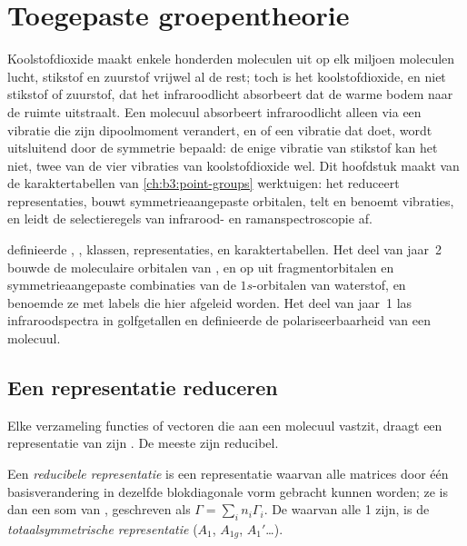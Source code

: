 \chapter{Toegepaste groepentheorie}\label{ch:b3:group-theory-applied}

Koolstofdioxide maakt enkele honderden moleculen uit op elk miljoen
moleculen lucht, stikstof en zuurstof vrijwel al de rest; toch is het
koolstofdioxide, en niet stikstof of zuurstof, dat het infraroodlicht
absorbeert dat de warme bodem naar de ruimte uitstraalt. Een molecuul
absorbeert infraroodlicht alleen via een vibratie die zijn dipoolmoment
verandert, en of een vibratie dat doet, wordt uitsluitend door de
symmetrie bepaald: de enige vibratie van stikstof kan het niet, twee van
de vier vibraties van koolstofdioxide wel. Dit hoofdstuk maakt van de
karaktertabellen van
\cref{ch:b3:point-groups} werktuigen: het reduceert representaties,
bouwt symmetrieaangepaste orbitalen, telt en benoemt vibraties, en leidt
de selectieregels van infrarood- en ramanspectroscopie af.

\begin{recall}
 definieerde , ,
klassen, representaties,  en karaktertabellen. Het deel van
jaar~2 bouwde de moleculaire orbitalen van ,  en 
op uit fragmentorbitalen en symmetrieaangepaste combinaties van de
$1s$-orbitalen van waterstof, en benoemde ze met labels die hier
afgeleid worden. Het deel van jaar~1 las infraroodspectra in golfgetallen
en definieerde de polariseerbaarheid van een molecuul.
\end{recall}

\section{Een representatie reduceren}

Elke verzameling functies of vectoren die aan een molecuul vastzit,
draagt een representatie van zijn . De meeste zijn reducibel.

\begin{definition}\label{def:b3:group-theory-applied:reducible}
Een \emph{reducibele representatie} is een
representatie waarvan alle matrices door één basisverandering in dezelfde
blokdiagonale vorm gebracht kunnen worden; ze is dan een som van
, geschreven als $\Gamma = \sum_in_i\Gamma_i$. De
 waarvan alle  1 zijn, is de
\emph{totaalsymmetrische
representatie} ($A_1$, $A_{1g}$,
$A_1'$\dots).
\end{definition}

